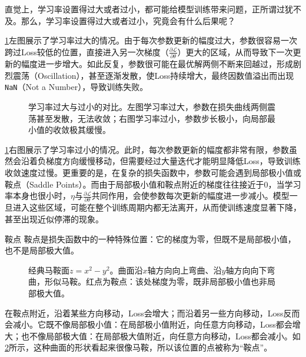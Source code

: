 直觉上，学习率设置得过大或者过小，都可能给模型训练带来问题，正所谓过犹不及。那么，学习率设置得过大或者过小，究竟会有什么后果呢？

\cref{fig:learning_rate_bad}左图展示了学习率过大的情况。由于每次参数更新的幅度过大，参数很容易一次跨过Loss较低的位置，直接进入另一次梯度（$\frac{\partial \mathcal{L}}{\partial \theta}$）更大的区域，从而导致下一次更新的幅度进一步增大。如此反复，参数很可能在最优解两侧不断来回越过，形成剧烈震荡（Oscillation），甚至逐渐发散，使Loss持续增大，最终因数值溢出而出现\texttt{NaN}（Not a Number），导致训练失败。

\begin{figure}[H]
    \caption{学习率过大与过小的对比。左图学习率过大，参数在损失曲线两侧震荡甚至发散，无法收敛；右图学习率过小，参数步长极小，向局部最小值的收敛极其缓慢。}
    \label{fig:learning_rate_bad}
\end{figure}

\cref{fig:learning_rate_bad}右图展示了学习率过小的情况。此时，每次参数更新的幅度都非常有限，参数虽然会沿着负梯度方向缓慢移动，但需要经过大量迭代才能明显降低Loss，导致训练收敛速度过慢。更重要的是，在复杂的损失函数中，参数可能会遇到局部极小值或鞍点（Saddle Points）。而由于局部极小值和鞍点附近的梯度往往接近于$0$，当学习率本身也很小时，$\eta$与$\frac{\partial\mathcal{L}}{\partial\theta}$共同作用，会使参数每次更新的幅度进一步减小。模型一旦进入这些区域，可能在整个训练周期内都无法离开，从而使训练速度显著下降，甚至出现近似停滞的现象。

\begin{orangeBox}{鞍点}
鞍点是损失函数中的一种特殊位置：它的梯度为零，但既不是局部极小值，也不是局部极大值。

\begin{figure}[H]
    \caption{经典马鞍面$z = x^2 - y^2$。曲面沿$x$轴方向向上弯曲、沿$y$轴方向向下弯曲，形似马鞍。红点为鞍点：该处梯度为零，既非局部极小值也非局部极大值。}
    \label{fig:saddle_landscape}
\end{figure}

在鞍点附近，沿着某些方向移动，Loss会增大；而沿着另一些方向移动，Loss反而会减小。它既不像局部极小值：在局部极小值附近，向任意方向移动，Loss都会增大；也不像局部极大值：在局部极大值附近，向任意方向移动，Loss都会减小。如\cref{fig:saddle_landscape}所示，这种曲面的形状看起来很像马鞍，所以该位置的点被称为“鞍点”。
\end{orangeBox}

